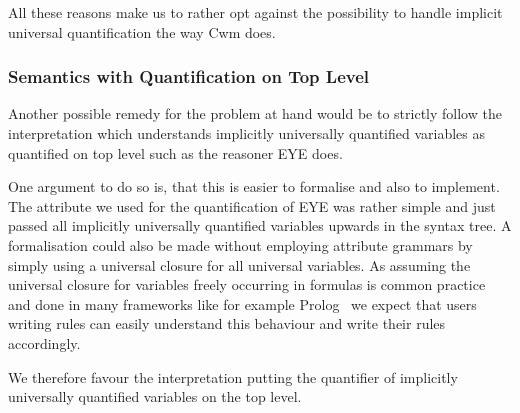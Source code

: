 All these reasons make us to rather opt against the possibility to handle implicit universal quantification the way Cwm does.


\subsubsection{Semantics with Quantification on Top Level}
Another possible remedy for the problem at hand would be to strictly follow the interpretation
which understands implicitly universally quantified variables as quantified on top level such as
the reasoner EYE does.

One argument to do so is, that this is easier to formalise and also to implement. The attribute we used for the quantification of EYE was rather simple and just passed all implicitly 
universally quantified variables upwards in the syntax tree. A formalisation could also be made without employing attribute grammars by simply using a universal closure for all universal variables.
As assuming the universal closure for variables freely occurring in  formulas is common practice and done in many frameworks like 
for example Prolog~\cite{Prolog} we expect that users writing \nthree rules can easily understand this behaviour and write their rules 
accordingly.

We therefore favour the interpretation putting the quantifier of implicitly universally quantified variables on the top level.



